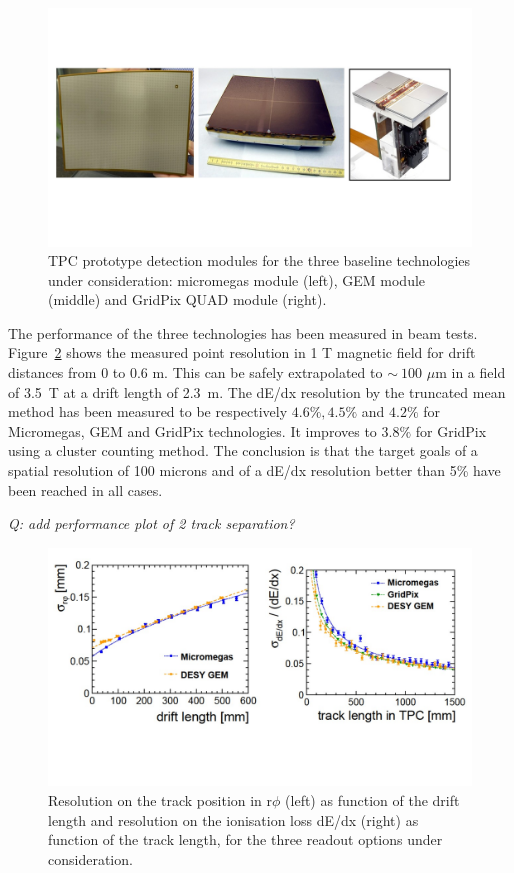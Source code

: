 \begin{figure}[t!]
\centering
\includegraphics[width=1.0\hsize]{Detector/fig/TPC_prototypes.jpg}
\caption{TPC prototype detection modules for the three baseline technologies under consideration: micromegas module (left), GEM module (middle) and GridPix QUAD module (right).}
\label{fig:det:TPC_prototypes}
\end{figure}

The performance of the three technologies has been measured in beam tests. Figure~\ref{fig:det:TPC_performances} shows the measured point resolution in 1 T magnetic field for drift distances from 0 to 0.6 m. This can be safely extrapolated to $\sim~100$ $\mu$m in a field of 3.5~T at a drift length of 2.3~m. The dE/dx resolution by the truncated mean method has been measured to be respectively $4.6\%, 4.5\%$ and $4.2\%$ for Micromegas, GEM and GridPix technologies. It improves to $3.8\%$ for GridPix using a cluster counting method. The conclusion is that the target goals of a spatial resolution of 100 microns and of a dE/dx resolution better than 5\% have been reached in all cases.   

\textit{Q: add performance plot of 2 track separation?}

\begin{figure}[t!]
\centering
\includegraphics[width=1.0\hsize]{Detector/fig/TPC_performances.jpg}
\caption{Resolution on the track position in r$\phi$ (left) as function of the drift length and resolution on the ionisation loss dE/dx (right) as function of the track length, for the three readout options under consideration.}
\label{fig:det:TPC_performances}
\end{figure}


